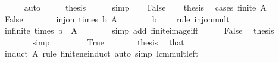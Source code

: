 \begin{isabellebody}
\ \ \ \ \isamarkupfalse%
\ auto\isanewline
\ \ \isamarkupfalse%
\ \isamarkupfalse%
\ {\isacharquery}{\kern0pt}thesis\isanewline
\ \ \ \ \isamarkupfalse%
\ simp\isanewline
{}\isamarkupfalse%
\isanewline
\ \ \isamarkupfalse%
\ False\isanewline
\ \ \isamarkupfalse%
\ {\isacharquery}{\kern0pt}thesis\ \isamarkupfalse%
\ {\isacharparenleft}{\kern0pt}cases\ {\isachardoublequoteopen}finite\ A{\isachardoublequoteclose}{\isacharparenright}{\kern0pt}\isanewline
\ \ \ \ \isamarkupfalse%
\ False\isanewline
\ \ \ \ \isamarkupfalse%
\ \isamarkupfalse%
\ {\isachardoublequoteopen}inj{\isacharunderscore}{\kern0pt}on\ {\isacharparenleft}{\kern0pt}times\ b{\isacharparenright}{\kern0pt}\ A{\isachardoublequoteclose}\isanewline
\ \ \ \ \ \ \isamarkupfalse%
\ {\isacartoucheopen}b\ {\isasymnoteq}\ {}{\isacartoucheclose}\ \isamarkupfalse%
\ {\isacharparenleft}{\kern0pt}rule\ inj{\isacharunderscore}{\kern0pt}on{\isacharunderscore}{\kern0pt}mult{\isacharparenright}{\kern0pt}\isanewline
\ \ \ \ \isamarkupfalse%
\ \isamarkupfalse%
\ {\isachardoublequoteopen}infinite\ {\isacharparenleft}{\kern0pt}times\ b\ {\isacharbackquote}{\kern0pt}\ A{\isacharparenright}{\kern0pt}{\isachardoublequoteclose}\isanewline
\ \ \ \ \ \ \isamarkupfalse%
\ {\isacharparenleft}{\kern0pt}simp\ add{\isacharcolon}{\kern0pt}\ finite{\isacharunderscore}{\kern0pt}image{\isacharunderscore}{\kern0pt}iff{\isacharparenright}{\kern0pt}\isanewline
\ \ \ \ \isamarkupfalse%
\ False\ \isamarkupfalse%
\ {\isacharquery}{\kern0pt}thesis\isanewline
\ \ \ \ \ \ \isamarkupfalse%
\ simp\isanewline
\ \ \isamarkupfalse%
\isanewline
\ \ \ \ \isamarkupfalse%
\ True\isanewline
\ \ \ \ \isamarkupfalse%
\ \isamarkupfalse%
\ {\isacharquery}{\kern0pt}thesis\ \isamarkupfalse%
\ that\isanewline
\ \ \ \ \ \ \isamarkupfalse%
\ {\isacharparenleft}{\kern0pt}induct\ A\ rule{\isacharcolon}{\kern0pt}\ finite{\isacharunderscore}{\kern0pt}ne{\isacharunderscore}{\kern0pt}induct{\isacharparenright}{\kern0pt}\ {\isacharparenleft}{\kern0pt}auto\ simp{\isacharcolon}{\kern0pt}\ lcm{\isacharunderscore}{\kern0pt}mult{\isacharunderscore}{\kern0pt}left{\isacharparenright}{\kern0pt}\isanewline
\ \ \isamarkupfalse%

\end{isabellebody}
